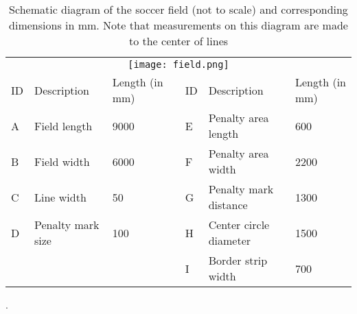\begin{table}[h]
\begin{adjustbox}{max width=\textwidth}
\begin{tabular}{lllllll}
\multicolumn{7}{c}{\texttt{[image: field.png]}}\\
\multicolumn{1}{|l|}{ID} & \multicolumn{1}{l|}{Description}       & \multicolumn{1}{l|}{Length (in mm)} & \multicolumn{1}{l|}{} & \multicolumn{1}{l|}{ID} & \multicolumn{1}{l|}{Description}            & \multicolumn{1}{l|}{Length (in mm)} \\ \cline{1-3} \cline{5-7} 
\multicolumn{1}{|l|}{A}  & \multicolumn{1}{l|}{Field length}      & \multicolumn{1}{l|}{9000}           & \multicolumn{1}{l|}{} & \multicolumn{1}{l|}{E}  & \multicolumn{1}{l|}{Penalty area length}    & \multicolumn{1}{l|}{600}            \\ \cline{1-3} \cline{5-7} 
\multicolumn{1}{|l|}{B}  & \multicolumn{1}{l|}{Field width}       & \multicolumn{1}{l|}{6000}           & \multicolumn{1}{l|}{} & \multicolumn{1}{l|}{F}  & \multicolumn{1}{l|}{Penalty area width}     & \multicolumn{1}{l|}{2200}           \\ \cline{1-3} \cline{5-7} 
\multicolumn{1}{|l|}{C}  & \multicolumn{1}{l|}{Line width}        & \multicolumn{1}{l|}{50}             & \multicolumn{1}{l|}{} & \multicolumn{1}{l|}{G}  & \multicolumn{1}{l|}{Penalty mark distance}  & \multicolumn{1}{l|}{1300}           \\ \cline{1-3} \cline{5-7} 
\multicolumn{1}{|l|}{D}  & \multicolumn{1}{l|}{Penalty mark size} & \multicolumn{1}{l|}{100}            & \multicolumn{1}{l|}{} & \multicolumn{1}{l|}{H}  & \multicolumn{1}{l|}{Center circle diameter} & \multicolumn{1}{l|}{1500}           \\ \cline{1-3} \cline{5-7} 
\multicolumn{1}{|l|}{}   & \multicolumn{1}{l|}{}                  & \multicolumn{1}{l|}{}               & \multicolumn{1}{l|}{} & \multicolumn{1}{l|}{I}  & \multicolumn{1}{l|}{Border strip width}     & \multicolumn{1}{l|}{700}           
\end{tabular}
\end{adjustbox}
\caption[Schematic diagram of the soccer field]{Schematic diagram of the soccer field (not to scale) and corresponding dimensions in
  mm. Note that measurements on this diagram are made to the center of lines \cite{Committee2013}}.
\label{tab:field}
\end{table}
